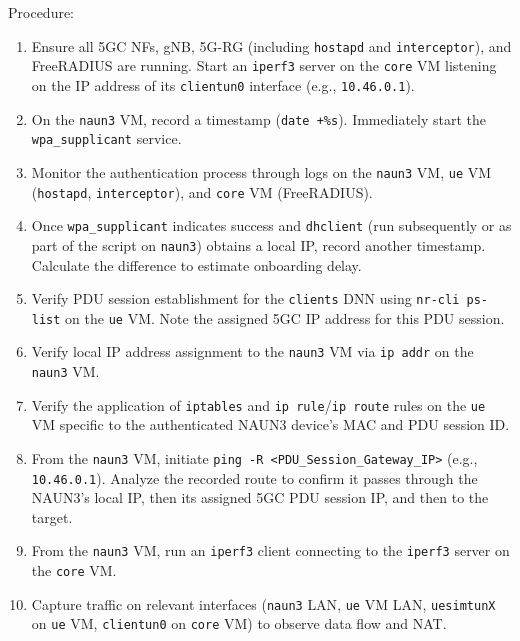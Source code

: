 Procedure:
\begin{enumerate}
    \item Ensure all \ac{5GC} \acp{NF}, \ac{gNB}, \ac{5G-RG} (including \texttt{hostapd} and \texttt{interceptor}), and FreeRADIUS are running. Start an \texttt{iperf3} server on the \texttt{core} \ac{VM} listening on the \ac{IP} address of its \texttt{clientun0} interface (e.g., \texttt{10.46.0.1}).

    \item On the \texttt{naun3} \ac{VM}, record a timestamp (\texttt{date +\%s}). Immediately start the \texttt{wpa\_supplicant} service.

    \item Monitor the authentication process through logs on the \texttt{naun3} \ac{VM}, \texttt{ue} \ac{VM} (\texttt{hostapd}, \texttt{interceptor}), and \texttt{core} \ac{VM} (FreeRADIUS).

    \item Once \texttt{wpa\_supplicant} indicates success and \texttt{dhclient} (run subsequently or as part of the script on \texttt{naun3}) obtains a local \ac{IP}, record another timestamp. Calculate the difference to estimate onboarding delay.
    
    \item Verify \ac{PDU} session establishment for the \texttt{clients} \ac{DNN} using \texttt{nr-cli ps-list} on the \texttt{ue} \ac{VM}. Note the assigned \ac{5GC} \ac{IP} address for this \ac{PDU} session.
    
    \item Verify local \ac{IP} address assignment to the \texttt{naun3} \ac{VM} via \texttt{ip addr} on the \texttt{naun3} \ac{VM}.
    
    \item Verify the application of \texttt{iptables} and \texttt{ip rule}/\texttt{ip route} rules on the \texttt{ue} \ac{VM} specific to the authenticated \ac{NAUN3} device's \ac{MAC} and \ac{PDU} session ID.
    
    \item From the \texttt{naun3} \ac{VM}, initiate \texttt{ping -R <PDU\_Session\_Gateway\_IP>} (e.g., \texttt{10.46.0.1}). Analyze the recorded route to confirm it passes through the \ac{NAUN3}'s local \ac{IP}, then its assigned \ac{5GC} \ac{PDU} session \ac{IP}, and then to the target.
    
    \item From the \texttt{naun3} \ac{VM}, run an \texttt{iperf3} client connecting to the \texttt{iperf3} server on the \texttt{core} \ac{VM}.
    
    \item Capture traffic on relevant interfaces (\texttt{naun3} \ac{LAN}, \texttt{ue} \ac{VM} \ac{LAN}, \texttt{uesimtunX} on \texttt{ue} \ac{VM}, \texttt{clientun0} on \texttt{core} \ac{VM}) to observe data flow and \ac{NAT}.
\end{enumerate}


